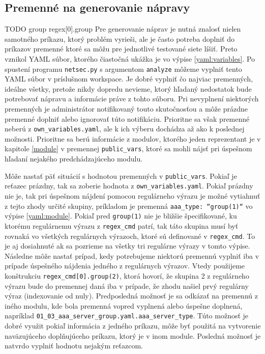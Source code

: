 \subsection{Premenné na generovanie nápravy}
\label{variables_generate}
TODO group regex[0].group
Pre generovanie náprav je nutná znalosť nielen samotného príkazu, ktorý problém vyrieši, ale je často potreba doplniť do príkazov premenné ktoré sa môžu pre jednotlivé testované siete líšiť. Preto vznikol YAML súbor, ktorého čiastočná ukážka je vo výpise \ref{yaml:variables}. Po spustení programu \texttt{netsec.py} s argumentom \texttt{analyze} môžeme vyplniť tento YAML súbor v príslušnom workspace. Je dobré vyplniť čo najviac premenných, ideálne všetky, pretože nikdy dopredu nevieme, ktorý hľadaný nedostatok bude potrebovať nápravu a informácie práve z tohto súboru. Pri nevyplnení niektorých premenných je administrátor notifikovaný touto skutočnosťou a môže prázdne premenné doplniť alebo ignorovať túto notifikáciu. Prioritne sa však premenné neberú z \texttt{own\_variables.yaml}, ale k ich výberu dochádza až ako k poslednej možnosti. Prioritne sa berú informácie z modulov, ktorého jeden reprezentant je v kapitole \ref{module} v premennej \texttt{public\_vars}, ktoré sa mohli nájsť pri úspešnom hľadaní nejakého predchádzajúceho modulu. 

Môže nastať päť situácií s hodnotou premenných v \texttt{public\_vars}. Pokiaľ je reťazec prázdny, tak sa zoberie hodnota z \texttt{own\_variables.yaml}. Pokiaľ prázdny nie je, tak pri úspešnom nájdení pomocou regulárneho výrazu je možné vytiahnuť z tejto zhody určité skupiny, príkladom je premenná \texttt{aaa\_type: ``group(1)``} vo výpise \ref{yaml:module}. Pokiaľ pred \texttt{group(1)} nie je bližšie špecifikované, ku ktorému regulárnemu výrazu z \texttt{regex\_cmd} patrí, tak táto skupina musí byť rovnaká vo všetkých regulárnych výrazoch, ktoré sú definované v \texttt{regex\_cmd}. To je aj dosiahnuté ak sa pozrieme na všetky tri regulárne výrazy v tomto výpise. Následne môže nastať prípad, kedy potrebujeme niektorú premennú vyplniť iba v prípade úspešného nájdenia jedného z regulárnych výrazov. Vtedy použijeme konštrukciu \texttt{regex\_cmd[0].group(2)}, ktorá hovorí, že skupina 2 z regulárneho výrazu bude do premennej daná iba v prípade, že zhodu našiel prvý regulárny výraz (indexovanie od nuly). Predposledná možnosť je sa odkázať na premennú z iného modulu, kde bola premenná vopred vyplnená alebo úspešne doplnená, napríklad \texttt{01\_03\_aaa\_server\_group.yaml.aaa\_server\_type}. Túto možnosť je dobré využit pokiaľ informácia z jedného príkazu, môže byť použitá na vytvorenie naväzujúceho doplňujúceho príkazu, ktorý je v inom module. Posledná možnosť je natvrdo vyplniť hodnotu nejakým reťazcom.

